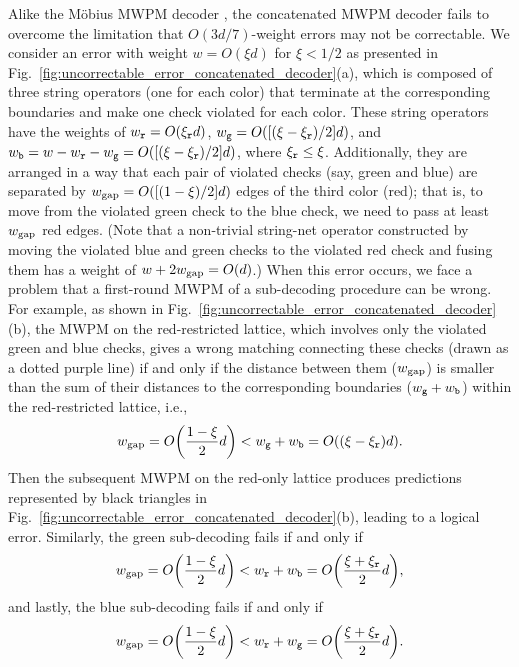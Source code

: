 \documentclass[a4paper,twocolumn,11pt,accepted=2025-01-21]{quantumarticle}
\theoremstyle{definition}
\theoremstyle{definition}
\theoremstyle{definition}
\begin{document}
Alike the Möbius MWPM decoder \cite{sahay2022decoder}, the concatenated MWPM decoder fails to overcome the limitation that $O(3d/7)$-weight errors may not be correctable.
We consider an error with weight $w = O(\xi d)$ for $\xi < 1/2$ as presented in Fig.~\ref{fig:uncorrectable_error_concatenated_decoder}(a), which is composed of three string operators (one for each color) that terminate at the corresponding boundaries and make one check violated for each color.
These string operators have the weights of $w_{\texttt{r}} = O(\xi_{\texttt{r}} d)$, $w_{\texttt{g}} = O([(\xi - \xi_{\texttt{r}})/2]d)$, and $w_{\texttt{b}} = w - w_{\texttt{r}} - w_{\texttt{g}} = O([(\xi - \xi_{\texttt{r}})/2]d)$, where $\xi_{\texttt{r}} \leq \xi$.
Additionally, they are arranged in a way that each pair of violated checks (say, green and blue) are separated by $w_{\mathrm{gap}} = O([(1-\xi)/2]d)$ edges of the third color (red); that is, to move from the violated green check to the blue check, we need to pass at least $w_{\mathrm{gap}}$ red edges.
(Note that a non-trivial string-net operator constructed by moving the violated blue and green checks to the violated red check and fusing them has a weight of $w + 2w_{\mathrm{gap}} = O(d)$.)
When this error occurs, we face a problem that a first-round MWPM of a sub-decoding procedure can be wrong.
For example, as shown in Fig.~\ref{fig:uncorrectable_error_concatenated_decoder}(b), the MWPM on the red-restricted lattice, which involves only the violated green and blue checks, gives a wrong matching connecting these checks (drawn as a dotted purple line) if and only if the distance between them ($w_{\mathrm{gap}}$) is smaller than the sum of their distances to the corresponding boundaries ($w_{\texttt{g}} + w_{\texttt{b}}$) within the red-restricted lattice, i.e.,
\begin{align}
    w_{\mathrm{gap}} = O\qty(\frac{1-\xi}{2}d) < w_{\texttt{g}} + w_{\texttt{b}} = O\qty(\qty(\xi - \xi_{\texttt{r}})d).
    \label{eq:uncorrectable_condition_red}
\end{align}
Then the subsequent MWPM on the red-only lattice produces predictions represented by black triangles in Fig.~\ref{fig:uncorrectable_error_concatenated_decoder}(b), leading to a logical error.
Similarly, the green sub-decoding fails if and only if
\begin{align}
    w_{\mathrm{gap}} = O\qty(\frac{1-\xi}{2}d) < w_{\texttt{r}} + w_{\texttt{b}} = O\qty(\frac{\xi + \xi_{\texttt{r}}}{2}d),
    \label{eq:uncorrectable_condition_green}
\end{align}
and lastly, the blue sub-decoding fails if and only if
\begin{align}
    w_{\mathrm{gap}} = O\qty(\frac{1-\xi}{2}d) < w_{\texttt{r}} + w_{\texttt{g}} = O\qty(\frac{\xi + \xi_{\texttt{r}}}{2}d).
    \label{eq:uncorrectable_condition_blue}
\end{align}
\end{document}
